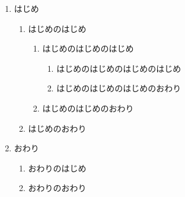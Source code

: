 \documentclass[12pt]{jarticle}
\begin{document}
\begin {enumerate}
\item はじめ
\begin{enumerate}
\item はじめのはじめ
\begin{enumerate}
\item はじめのはじめのはじめ
\begin{enumerate}
\item はじめのはじめのはじめのはじめ
\item はじめのはじめのはじめのおわり
\end{enumerate}
\item はじめのはじめのおわり
\end{enumerate}
\item はじめのおわり
\end{enumerate}
\item おわり
\begin{enumerate}
\item おわりのはじめ
\item おわりのおわり
\end{enumerate}
\end{enumerate}
\end{document}

